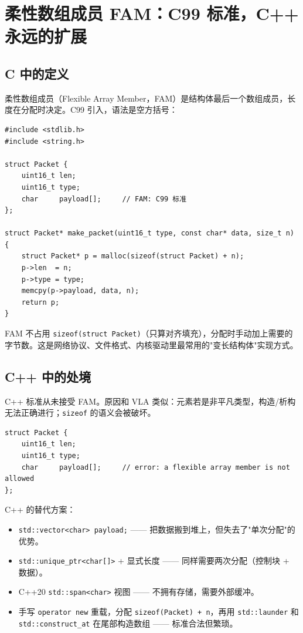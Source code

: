 \documentclass[12pt,a4paper,fontset=fandol]{ctexbook}
\newcommand{\cpplabel}{%
  \tcbox[on line,colback=cppheadbg,colframe=cppheadbg,
    boxrule=0pt,arc=1pt,left=2pt,right=2pt,top=1pt,bottom=1pt,
    colupper=white,fontupper=\scriptsize\bfseries]{C++}}
\newcommand{\clabel}{%
  \tcbox[on line,colback=cheadbg,colframe=cheadbg,
    boxrule=0pt,arc=1pt,left=2pt,right=2pt,top=1pt,bottom=1pt,
    colupper=white,fontupper=\scriptsize\bfseries]{C}}
\newcommand{\cpp}[1]{C++#1}
\newcommand{\kw}[1]{\texttt{#1}}
\begin{document}

\chapter{柔性数组成员 FAM：C99 标准，C++ 永远的扩展}

\section{C 中的定义}

柔性数组成员（Flexible Array Member，FAM）是结构体最后一个数组成员，长度在分配时决定。C99 引入，语法是空方括号：

\clabel{}
\begin{lstlisting}[style=cstyle]
#include <stdlib.h>
#include <string.h>

struct Packet {
    uint16_t len;
    uint16_t type;
    char     payload[];     // FAM: C99 标准
};

struct Packet* make_packet(uint16_t type, const char* data, size_t n) {
    struct Packet* p = malloc(sizeof(struct Packet) + n);
    p->len  = n;
    p->type = type;
    memcpy(p->payload, data, n);
    return p;
}
\end{lstlisting}

FAM 不占用 \kw{sizeof(struct Packet)}（只算对齐填充），分配时手动加上需要的字节数。这是网络协议、文件格式、内核驱动里最常用的"变长结构体"实现方式。

\section{C++ 中的处境}

\cpp{} 标准从未接受 FAM。原因和 VLA 类似：元素若是非平凡类型，构造/析构无法正确进行；\kw{sizeof} 的语义会被破坏。

\cpplabel{}
\begin{lstlisting}
struct Packet {
    uint16_t len;
    uint16_t type;
    char     payload[];     // error: a flexible array member is not allowed
};
\end{lstlisting}

\cpp{} 的替代方案：
\begin{itemize}
  \item \kw{std::vector<char> payload;} —— 把数据搬到堆上，但失去了"单次分配"的优势。
  \item \kw{std::unique\_ptr<char[]>} + 显式长度 —— 同样需要两次分配（控制块 + 数据）。
  \item C++20 \kw{std::span<char>} 视图 —— 不拥有存储，需要外部缓冲。
  \item 手写 \kw{operator new} 重载，分配 \kw{sizeof(Packet) + n}，再用 \kw{std::\allowbreak{}launder} 和 \kw{std::\allowbreak{}construct\_\allowbreak{}at} 在尾部构造数组 —— 标准合法但繁琐。
\end{itemize}
\end{document}

